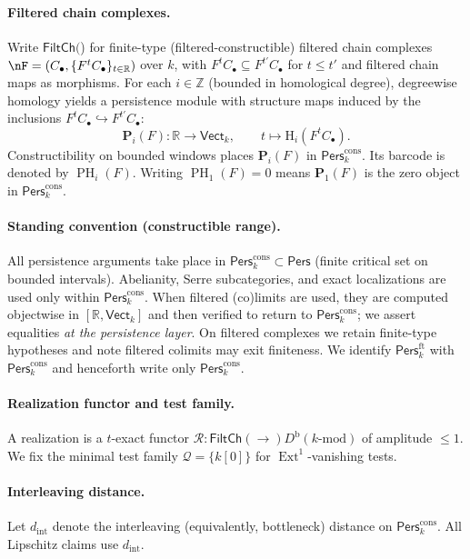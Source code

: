 \documentclass[11pt]{article}
\numberwithin{equation}{section}
\theoremstyle{plain}
\theoremstyle{definition}
\theoremstyle{remark}
\DeclareMathOperator{\Ext}{Ext}
\DeclareMathOperator{\PH}{PH}
\newcommand{\Pers}{\mathsf{Pers}}
\theoremstyle{plain}
\theoremstyle{definition}
\numberwithin{equation}{section}
\theoremstyle{definition}
\DeclareRobustCommand{\FiltCh}[1]{\mathsf{FiltCh}(#1)}
\numberwithin{equation}{section}
\theoremstyle{plain}
\theoremstyle{definition}
\theoremstyle{remark}
\newcommand{\bbR}{\mathbb{R}}
\newcommand{\Vectk}{\mathsf{Vect}_k}
\newcommand{\Dbk}{D^{\mathrm{b}}(k\text{-mod})}
\newcommand{\Perscons}{\Pers^{\mathrm{cons}}_k}
\newcommand{\Persft}{\Pers^{\mathrm{ft}}_k}
\newcommand{\intdist}{d_{\mathrm{int}}}
\providecommand{\intdist}{d_{\mathrm{int}}}  %
\providecommand{\n}{\unskip\space}
\begin{document}
\paragraph{Filtered chain complexes.}
Write \(\FiltCh\) for finite-type (filtered-constructible) filtered chain complexes
\(\nF=(C_\bullet,\{F^{t}C_\bullet\}_{t\in\bbR})\n\)
over \(k\), with \(F^{t}C_\bullet\subseteq F^{t'}C_\bullet\) for \(t\le t'\) and filtered chain maps as morphisms. For each \(i\in\mathbb{Z}\) (bounded in homological degree), degreewise homology yields a persistence module with structure maps induced by the inclusions \(F^{t}C_\bullet\hookrightarrow F^{t'}C_\bullet\):
\[
\mathbf{P}_i(F)\colon \bbR\to \Vectk,\qquad t\longmapsto \mathrm{H}_i(F^{t}C_\bullet).
\]
Constructibility on bounded windows places \(\mathbf{P}_i(F)\) in \(\Perscons\). Its barcode is denoted by \(\PH_i(F)\). Writing \(\PH_1(F)=0\) means \(\mathbf{P}_1(F)\) is the zero object in \(\Perscons\).

\paragraph{Standing convention (constructible range).}
All persistence arguments take place in \(\Perscons\subset\Pers\) (finite critical set on bounded intervals). Abelianity, Serre subcategories, and exact localizations are used only within \(\Perscons\). When filtered (co)limits are used, they are computed objectwise in \([\bbR,\Vectk]\) and then verified to return to \(\Perscons\); we assert equalities \emph{at the persistence layer}. On filtered complexes we retain finite-type hypotheses and note filtered colimits may exit finiteness. We identify \(\Persft\) with \(\Perscons\) and henceforth write only \(\Perscons\).

\paragraph{Realization functor and test family.}
A realization is a \(t\)-exact functor \(\mathcal{R}:\FiltCh\to \Dbk\) of amplitude \(\le 1\). We fix the minimal test family \(\mathcal{Q}=\{k[0]\}\) for \(\Ext^1\)-vanishing tests.

\paragraph{Interleaving distance.}
Let \(\intdist\) denote the interleaving (equivalently, bottleneck) distance on \(\Perscons\). All Lipschitz claims use \(\intdist\).
\end{document}
